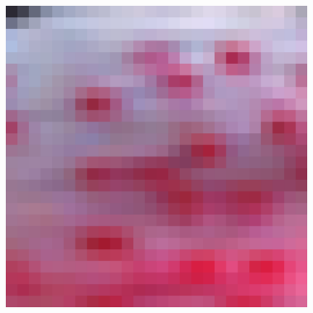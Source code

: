 \documentclass[review,numbers,sort&compress]{elsarticle}  %
\begin{document}
\begin{figure}[htbp]
{\begin{minipage}[b]{0.12\textwidth}
                \includegraphics[width=1\textwidth]{compareImage/SME_flowers_mag_2.png}
            \end{minipage}
        }
\end{figure}
\end{document}

